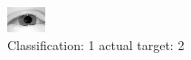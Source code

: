 \begin{figure}[h!]
\begin{center}
\includegraphics[width=0.60\columnwidth]{figures/ID2299_class_1_target_2.png}
\end{center}
\caption{ Classification: 1 actual target: 2}
\label{fig:ID2299_class_1_target_2}
\end{figure}
